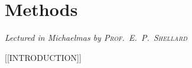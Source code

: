 \chapter[Methods \\ \textnormal{\emph{Lectured in Michaelmas \oldstylenums{2021} by \textsc{Prof.\ E.\ P.\ Shellard}}}]{Methods}
\emph{\Large Lectured in Michaelmas  by \textsc{Prof.\ E.\ P.\ Shellard}}

[[INTRODUCTION]]



